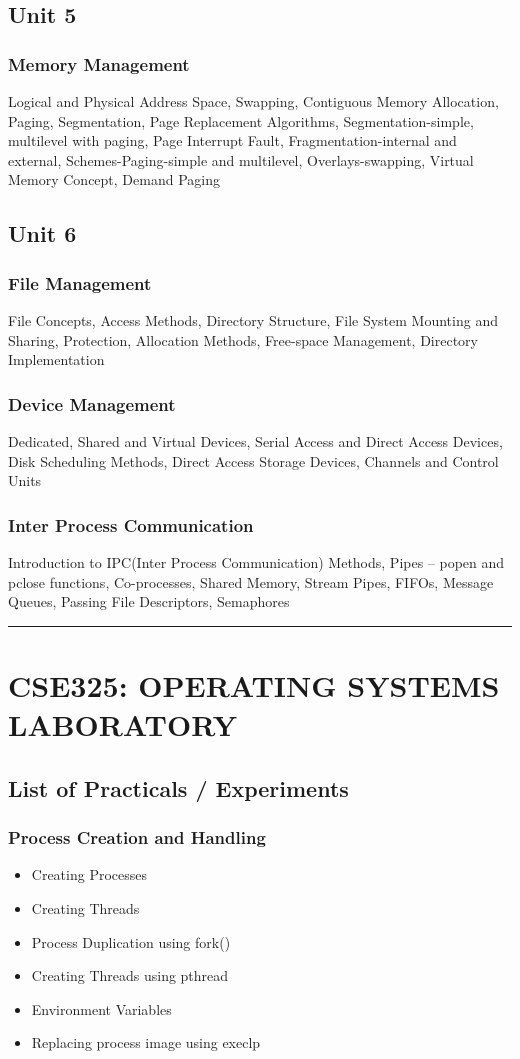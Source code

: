 \documentclass{article}
\begin{document}
\begin{multicols*}{2}
    \subsection*{Unit 5}
    \subsubsection*{Memory Management}
    Logical and Physical Address Space, Swapping, Contiguous Memory Allocation, Paging, Segmentation, Page Replacement Algorithms, Segmentation-simple, multilevel with paging, Page Interrupt Fault, Fragmentation-internal and external, Schemes-Paging-simple and multilevel, Overlays-swapping, Virtual Memory Concept, Demand Paging
    \subsection*{Unit 6}
    \subsubsection*{File Management}
    File Concepts, Access Methods, Directory Structure, File System Mounting and Sharing, Protection, Allocation Methods, Free-space Management, Directory Implementation
    \subsubsection*{Device Management}
    Dedicated, Shared and Virtual Devices, Serial Access and Direct Access Devices, Disk Scheduling Methods, Direct Access Storage Devices, Channels and Control Units
    \subsubsection*{Inter Process Communication}
    Introduction to IPC(Inter Process Communication) Methods, Pipes – popen and pclose functions, Co-processes, Shared Memory, Stream Pipes, FIFOs, Message Queues, Passing File Descriptors, Semaphores \\
    \hrule
    \section*{CSE325: OPERATING SYSTEMS LABORATORY}
    \subsection*{List of Practicals / Experiments}
    \subsubsection*{Process Creation and Handling}
    \begin{itemize}
        \item Creating Processes
        \item Creating Threads
        \item Process Duplication using fork()
        \item Creating Threads using pthread
        \item Environment Variables
        \item Replacing process image using execlp
    \end{itemize}

\end{multicols*}
\end{document}
